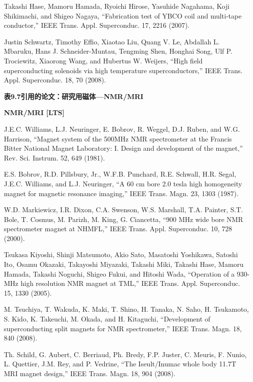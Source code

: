 \noindent [9.368] Takashi Hase, Mamoru Hamada, Ryoichi Hirose, Yasuhide Nagahama, Koji Shikimachi,
and Shigeo Nagaya, ``Fabrication test of YBCO coil and multi-tape conductor,”
IEEE Trans. Appl. Superconduc. 17, 2216 (2007).

\noindent [9.369] Justin Schwartz, Timothy Effio, Xiaotao Liu, Quang V. Le, Abdallah L. Mbaruku,
Hans J. Schneider-Muntau, Tengming Shen, Honghai Song, Ulf P. Trociewitz,
Xiaorong Wang, and Hubertus W. Weijers, ``High field superconducting solenoids
via high temperature superconductors,” IEEE Trans. Appl. Superconduc. 18, 70
(2008).

\noindent \textbf{表9.7引用的论文：研究用磁体---NMR/MRI}

\noindent \textbf{NMR/MRI [LTS]}

\noindent [9.370] J.E.C. Williams, L.J. Neuringer, E. Bobrov, R. Weggel, D.J. Ruben, and W.G.
Harrison, ``Magnet system of the 500MHz NMR spectrometer at the Francis
Bitter National Magnet Laboratory: I. Design and development of the magnet,”
Rev. Sci. Instrum. 52, 649 (1981).

\noindent [9.371] E.S. Bobrov, R.D. Pillsbury, Jr., W.F.B. Punchard, R.E. Schwall, H.R. Segal,
J.E.C. Williams, and L.J. Neuringer, ``A 60 cm bore 2.0 tesla high homogeneity
magnet for magnetic resonance imaging,” IEEE Trans. Magn. 23, 1303 (1987).

\noindent [9.372] W.D. Markiewicz, I.R. Dixon, C.A. Swenson, W.S. Marshall, T.A. Painter, S.T.
Bole, T. Cosmus, M. Parizh, M. King, G. Ciancetta, ``900 MHz wide bore
NMR spectrometer magnet at NHMFL,” IEEE Trans. Appl. Superconduc. 10, 728
(2000).

\noindent [9.373] Tsukasa Kiyoshi, Shinji Matsumoto, Akio Sato, Masatoshi Yoshikawa, Satoshi
Ito, Osamu Okazaki, Takayoshi Miyazaki, Takashi Miki, Takashi Hase, Mamoru
Hamada, Takashi Noguchi, Shigeo Fukui, and Hitoshi Wada, ``Operation of a 930-
MHz high resolution NMR magnet at TML,” IEEE Trans. Appl. Superconduc.
15, 1330 (2005).

\noindent [9.374] M. Tsuchiya, T. Wakuda, K. Maki, T. Shino, H. Tanaka, N. Saho, H. Tsukamoto,
S. Kido, K. Takeuchi, M. Okada, and H. Kitaguchi, ``Development of superconducting
split magnets for NMR spectrometer,” IEEE Trans. Magn. 18, 840 (2008).

\noindent [9.375] Th. Schild, G. Aubert, C. Berriaud, Ph. Bredy, F.P. Juster, C. Meuris, F. Nunio,
L. Quettier, J.M. Rey, and P. Vedrine, ``The Iseult/Inumac whole body 11.7T
MRI magnet design,” IEEE Trans. Magn. 18, 904 (2008).

